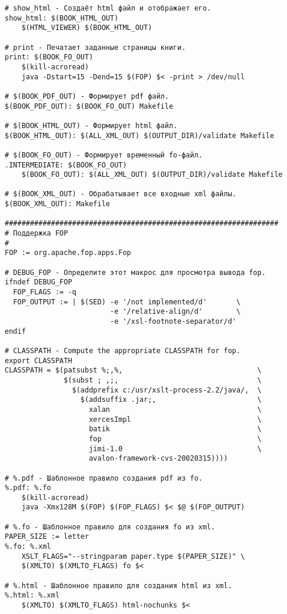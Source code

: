 \begin{verbatim}
# show_html - Создаёт html файл и отображает его.
show_html: $(BOOK_HTML_OUT)
    $(HTML_VIEWER) $(BOOK_HTML_OUT)

# print - Печатает заданные страницы книги.
print: $(BOOK_FO_OUT)
    $(kill-acroread)
    java -Dstart=15 -Dend=15 $(FOP) $< -print > /dev/null

# $(BOOK_PDF_OUT) - Формирует pdf файл.
$(BOOK_PDF_OUT): $(BOOK_FO_OUT) Makefile

# $(BOOK_HTML_OUT) - Формирует html файл.
$(BOOK_HTML_OUT): $(ALL_XML_OUT) $(OUTPUT_DIR)/validate Makefile

# $(BOOK_FO_OUT) - Формирует временный fo-файл.
.INTERMEDIATE: $(BOOK_FO_OUT)
    $(BOOK_FO_OUT): $(ALL_XML_OUT) $(OUTPUT_DIR)/validate Makefile

# $(BOOK_XML_OUT) - Обрабатывает все входные xml файлы.
$(BOOK_XML_OUT): Makefile

#################################################################
# Поддержка FOP
#
FOP := org.apache.fop.apps.Fop

# DEBUG_FOP - Определите этот макрос для просмотра вывода fop.
ifndef DEBUG_FOP
  FOP_FLAGS := -q
  FOP_OUTPUT := | $(SED) -e '/not implemented/d'       \
                         -e '/relative-align/d'        \
                         -e '/xsl-footnote-separator/d'
endif

# CLASSPATH - Compute the appropriate CLASSPATH for fop.
export CLASSPATH
CLASSPATH = $(patsubst %;,%,                                \
              $(subst ; ,;,                                 \
                $(addprefix c:/usr/xslt-process-2.2/java/,  \
                  $(addsuffix .jar;,                        \
                    xalan                                   \
                    xercesImpl                              \
                    batik                                   \
                    fop                                     \
                    jimi-1.0                                \
                    avalon-framework-cvs-20020315))))

# %.pdf - Шаблонное правило создания pdf из fo.
%.pdf: %.fo
    $(kill-acroread)
    java -Xmx128M $(FOP) $(FOP_FLAGS) $< $@ $(FOP_OUTPUT)

# %.fo - Шаблонное правило для создания fo из xml.
PAPER_SIZE := letter
%.fo: %.xml
    XSLT_FLAGS="--stringparam paper.type $(PAPER_SIZE)" \
    $(XMLTO) $(XMLTO_FLAGS) fo $<

# %.html - Шаблонное правило для создания html из xml.
%.html: %.xml
    $(XMLTO) $(XMLTO_FLAGS) html-nochunks $<


\end{verbatim}
